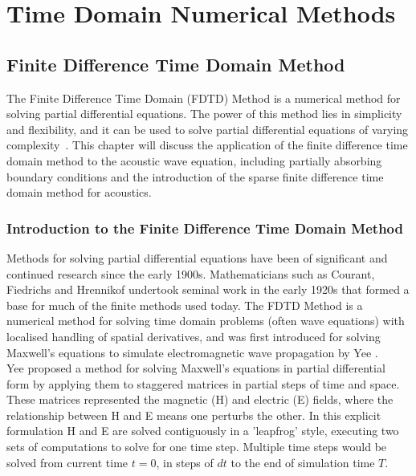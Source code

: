 %
%
%
\chapter{Time Domain Numerical Methods}
\section{Finite Difference Time Domain Method}
The Finite Difference Time Domain (FDTD) Method is a numerical method for solving partial differential equations. The power of this method lies in simplicity and flexibility, and it can be used to solve partial differential equations of varying complexity~\cite{Schneider2015}. This chapter will discuss the application of the finite difference time domain method to the acoustic wave equation, including partially absorbing boundary conditions and the introduction of the sparse finite difference time domain method for acoustics.

\subsection{Introduction to the Finite Difference Time Domain Method}
Methods for solving partial differential equations have been of significant and continued research since the early 1900s. Mathematicians such as Courant, Fiedrichs and Hrennikof undertook seminal work in the early 1920s that formed a base for much of the finite methods used today. The FDTD Method is a numerical method for solving time domain problems (often wave equations) with localised handling of spatial derivatives, and was first introduced for solving Maxwell's equations to simulate electromagnetic wave propagation by Yee \cite{Yee1966}.\\

Yee proposed a method for solving Maxwell's equations in partial differential form by applying them to staggered matrices in partial steps of time and space. These matrices represented the magnetic (H) and electric (E) fields, where the relationship between H and E means one perturbs the other. In this explicit formulation H and E are solved contiguously in a 'leapfrog' style, executing two sets of computations to solve for one time step. Multiple time steps would be solved from current time $t = 0$, in steps of $dt$ to the end of simulation time $T$.\\

